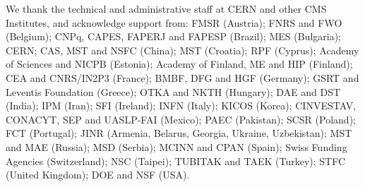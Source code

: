 
We thank the technical and administrative staff at CERN and other 
CMS Institutes, and acknowledge support from:
FMSR (Austria); 
FNRS and FWO (Belgium); 
CNPq, CAPES, FAPERJ and FAPESP (Brazil); 
MES (Bulgaria); 
CERN; 
CAS, MST and NSFC (China); 
MST (Croatia); 
RPF (Cyprus); 
Academy of Sciences and NICPB (Estonia); 
Academy of Finland, ME and HIP (Finland); 
CEA and CNRS/IN2P3 (France); 
BMBF, DFG and HGF (Germany); 
GSRT and Leventis Foundation (Greece); 
OTKA and NKTH (Hungary); 
DAE and DST (India); 
IPM (Iran); 
SFI (Ireland); 
INFN (Italy); 
KICOS (Korea); 
CINVESTAV, CONACYT, SEP and UASLP-FAI (Mexico); 
PAEC (Pakistan); 
SCSR (Poland); 
FCT (Portugal); 
JINR (Armenia, Belarus, Georgia, Ukraine, Uzbekistan);
MST and MAE (Russia);
MSD (Serbia);
MCINN and CPAN (Spain); 
Swiss Funding Agencies (Switzerland);
NSC (Taipei); 
TUBITAK and TAEK (Turkey); 
STFC (United Kingdom); 
DOE and NSF (USA).


